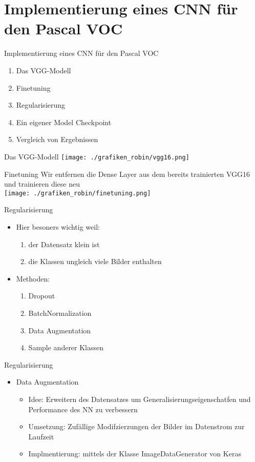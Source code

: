 \section{Implementierung eines CNN für den Pascal VOC}
\begin{frame}{Implementierung eines CNN für den Pascal VOC}
\begin{enumerate}
\item Das VGG-Modell
\item Finetuning
\item Regularisierung
\item Ein eigener Model Checkpoint
\item Vergleich von Ergebnissen
\end{enumerate}
\end{frame}

\begin{frame}{Das VGG-Modell}
\texttt{[image: ./grafiken\_robin/vgg16.png]}
\end{frame}

\begin{frame}{Finetuning}
Wir entfernen die Dense Layer aus dem bereits trainierten VGG16 und trainieren diese neu\\
\vspace*{0.5cm}
\texttt{[image: ./grafiken\_robin/finetuning.png]}
\end{frame}

\begin{frame}{Regularisierung}
\begin{itemize}
\item Hier besoners wichtig weil: 
\begin{enumerate}
\item der Datensatz klein ist
\item die Klassen ungleich viele Bilder enthalten
\end{enumerate}
\item Methoden:
\begin{enumerate}
\item Dropout
\item BatchNormalization
\item Data Augmentation
\item Sample anderer Klassen
\end{enumerate}
\end{itemize}
\end{frame}

\begin{frame}{Regularisierung}
\begin{itemize}
\item Data Augmentation
\begin{itemize}
\item Idee: Erweitern des Datensatzes um Generalisierungseigenschatfen und Performance des NN zu verbessern
\item Umsetzung: Zufällige Modifzierzungen der Bilder im Datenstrom zur Laufzeit
\item Implmentierung: mittels der Klasse ImageDataGenerator von Keras
\end{itemize}
\end{itemize}
\end{frame}


